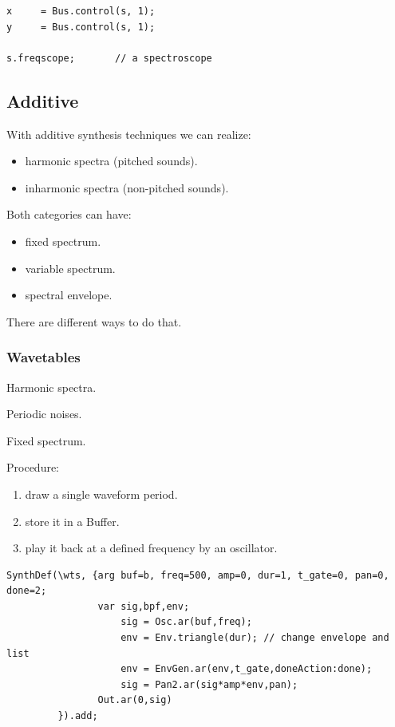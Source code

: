 \begin{itemize}
\begin{lstlisting}[frame=single] 
x     = Bus.control(s, 1);   
y     = Bus.control(s, 1);  

s.freqscope;       // a spectroscope
\end{lstlisting}
\end{itemize}

\subsection{Additive}\label{additive}

With additive synthesis techniques we can realize: 

\begin{itemize}
\tightlist
\item harmonic spectra (pitched sounds). 
\item inharmonic spectra (non-pitched sounds).
\end{itemize}

Both categories can have:

\begin{itemize}
\tightlist
\item fixed spectrum.
\item variable spectrum.
\item spectral envelope.
\end{itemize}

There are different ways to do that.

\subsubsection{Wavetables}\label{wavetables}

Harmonic spectra. 

Periodic noises.

Fixed spectrum.

Procedure:
\begin{enumerate}
\tightlist
\def\labelenumi{\arabic{enumi}.}
\item draw a single waveform period.
\item store it in a Buffer.
\item play it back at a defined frequency by an oscillator.
\end{enumerate}

\begin{lstlisting}[frame=single, caption=Wawtable lookup synthesis model] 
SynthDef(\wts, {arg buf=b, freq=500, amp=0, dur=1, t_gate=0, pan=0, done=2;
                var sig,bpf,env;
                    sig = Osc.ar(buf,freq);
                    env = Env.triangle(dur); // change envelope and list
                    env = EnvGen.ar(env,t_gate,doneAction:done);
                    sig = Pan2.ar(sig*amp*env,pan);
	            Out.ar(0,sig)
         }).add;
\end{lstlisting}

